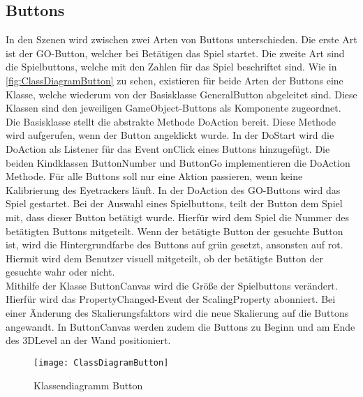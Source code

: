 \subsection{Buttons}
In den Szenen wird zwischen zwei Arten von Buttons unterschieden. Die erste Art ist der GO-Button, welcher bei Betätigen das Spiel startet. Die zweite Art sind die Spielbuttons, welche mit den Zahlen für das Spiel beschriftet sind. Wie in \autoref{fig:ClassDiagramButton} zu sehen, existieren für beide Arten der Buttons eine Klasse, welche wiederum von der Basisklasse {\ttfamily GeneralButton} abgeleitet sind. Diese Klassen sind den jeweiligen GameObject-Buttons als Komponente zugeordnet. Die Basisklasse stellt die abstrakte Methode DoAction bereit. Diese Methode wird aufgerufen, wenn der Button angeklickt wurde. In der DoStart wird die DoAction als Listener für das Event onClick eines Buttons hinzugefügt. Die beiden Kindklassen ButtonNumber und ButtonGo implementieren die DoAction Methode. Für alle Buttons soll nur eine Aktion passieren, wenn keine Kalibrierung des Eyetrackers läuft. In der DoAction des GO-Buttons wird das Spiel gestartet. Bei der Auswahl eines Spielbuttons, teilt der Button dem Spiel mit, dass dieser Button betätigt wurde. Hierfür wird dem Spiel die Nummer des betätigten Buttons mitgeteilt. Wenn der betätigte Button der gesuchte Button ist, wird die Hintergrundfarbe des Buttons auf grün gesetzt, ansonsten auf rot. Hiermit wird dem Benutzer visuell mitgeteilt, ob der betätigte Button der gesuchte wahr oder nicht. \\
Mithilfe der Klasse {\ttfamily ButtonCanvas} wird die Größe der Spielbuttons verändert. Hierfür wird das PropertyChanged-Event der ScalingProperty abonniert. Bei einer Änderung des Skalierungsfaktors wird die neue Skalierung auf die Buttons angewandt. In ButtonCanvas werden zudem die Buttons zu Beginn und am Ende des 3DLevel an der Wand positioniert. 

\begin{figure}[!htbp]
	\centering
	\texttt{[image: ClassDiagramButton]}
	\caption[Klassendiagramm Button]{Klassendiagramm Button}
	\label{fig:ClassDiagramButton}
\end{figure}

